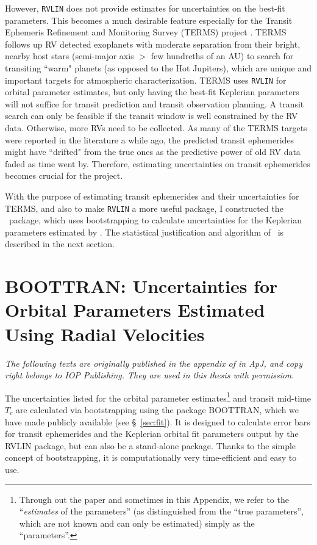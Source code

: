 However, {\tt RVLIN} does not provide estimates for uncertainties on
the best-fit parameters. This becomes a much desirable feature
especially for the Transit Ephemeris Refinement and Monitoring Survey
(TERMS) project \citep{Kane2009}. TERMS follows up RV detected
exoplanets with moderate separation from their bright, nearby host
stars (semi-major axis $>$ few hundreths of an AU) to search for
transiting ``warm" planets (as opposed to the Hot Jupiters), which are
unique and important targets for atmospheric characterization. TERMS
uses {\tt RVLIN} for orbital parameter estimates, but only having the
best-fit Keplerian parameters will not suffice for transit prediction
and transit observation planning. A transit search can only be
feasible if the transit window is well constrained by the RV
data. Otherwise, more RVs need to be collected. As many of the TERMS
targets were reported in the literature a while ago, the predicted
transit ephemerides might have ``drifted" from the true ones as the
predictive power of old RV data faded as time went by. Therefore,
estimating uncertainties on transit ephemerides becomes crucial for
the project.

With the purpose of estimating transit ephemerides and their
uncertainties for TERMS, and also to make {\tt RVLIN} a more useful
package, I constructed the \boottran\ package, which uses
bootstrapping to calculate uncertainties for the Keplerian parameters
estimated by \rvlin. The statistical justification and algorithm of
\boottran\ is described in the next section.



\section{BOOTTRAN: Uncertainties for Orbital Parameters Estimated
  Using Radial Velocities}\label{boottran:sec:boottran}

{\it
  The following texts are originally published in the appendix of
  \cite{wang2012} in {\it ApJ}, and copy right belongs to IOP
  Publishing. They are used in this thesis with permission.
}

The uncertainties listed for the orbital parameter
estimates\footnote{Through out the paper and sometimes in this
  Appendix, we refer to the ``{\it estimates} of the parameters'' (as
  distinguished from the ``true parameters'', which are not known and
  can only be estimated) simply as the ``parameters''.} and transit
mid-time $T_c$ are calculated via bootstrapping
\citep{1981,davison1997bootstrap} using the package BOOTTRAN, which we
have made publicly available (see \S~\ref{sec:fit}). It is designed to
calculate error bars for transit ephemerides and the Keplerian
orbital fit parameters output by the RVLIN
package\citep{2009ApJS..182..205W}, but can also be a stand-alone
package. Thanks to the simple concept of bootstrapping, it is
computationally very time-efficient and easy to use.

